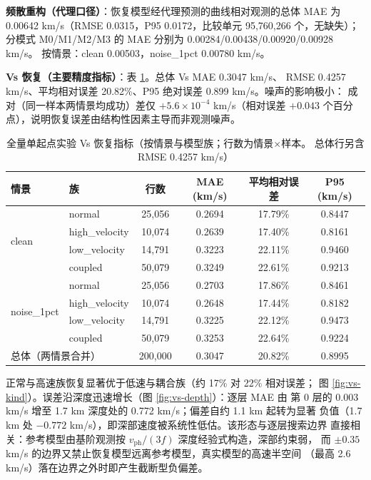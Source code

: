 \documentclass[UTF8,a4paper,11pt]{ctexart}
\begin{document}
\textbf{频散重构（代理口径）}：恢复模型经代理预测的曲线相对观测的总体 MAE 为
0.00642 km/s（RMSE 0.0315，P95 0.0172，比较单元 95{,}760{,}266 个，无缺失）；
分模式 M0/M1/M2/M3 的 MAE 分别为 0.00284/0.00438/0.00920/0.00928 km/s。
按情景：clean 0.00503，noise\_1pct 0.00780 km/s。

\textbf{Vs 恢复（主要精度指标）}：表 \ref{tab:full-vs}。总体 Vs MAE 0.3047 km/s、
RMSE 0.4257 km/s、平均相对误差 20.82\%、P95 绝对误差 0.899 km/s。噪声的影响极小：
成对（同一样本两情景均成功）差仅 \(+5.6\times10^{-4}\) km/s（相对误差 \(+0.043\)
个百分点），说明恢复误差由结构性因素主导而非观测噪声。

\begin{table}[H]
\centering
\caption{全量单起点实验 Vs 恢复指标（按情景与模型族；行数为情景\(\times\)样本。
总体行另含 RMSE 0.4257 km/s）}
\label{tab:full-vs}
\small
\begin{tabular}{llcccc}
\toprule
情景 & 族 & 行数 & MAE (km/s) & 平均相对误差 & P95 (km/s) \\
\midrule
\multirow{4}{*}{clean}
 & normal        & 25{,}056 & 0.2694 & 17.79\% & 0.8447 \\
 & high\_velocity & 10{,}074 & 0.2639 & 17.40\% & 0.8161 \\
 & low\_velocity  & 14{,}791 & 0.3223 & 22.11\% & 0.9460 \\
 & coupled       & 50{,}079 & 0.3249 & 22.61\% & 0.9213 \\
\midrule
\multirow{4}{*}{noise\_1pct}
 & normal        & 25{,}056 & 0.2703 & 17.86\% & 0.8461 \\
 & high\_velocity & 10{,}074 & 0.2648 & 17.44\% & 0.8182 \\
 & low\_velocity  & 14{,}791 & 0.3225 & 22.12\% & 0.9473 \\
 & coupled       & 50{,}079 & 0.3253 & 22.64\% & 0.9224 \\
\midrule
\multicolumn{2}{l}{总体（两情景合并）} & 200{,}000 & 0.3047 & 20.82\% & 0.8995 \\
\bottomrule
\end{tabular}
\end{table}

正常与高速族恢复显著优于低速与耦合族（约 17\% 对 22\% 相对误差；
图 \ref{fig:vs-kind}）。误差沿深度迅速增长（图 \ref{fig:vs-depth}）：逐层 MAE 由
第 0 层的 0.003 km/s 增至 1.7 km 深度处的 0.772 km/s；偏差自约 1.1 km 起转为显著
负值（1.7 km 处 \(-0.772\) km/s），即深部速度被系统性低估。该形态与逐层搜索边界
直接相关：参考模型由基阶观测按 \(v_{\text{ph}}/(3f)\) 深度经验式构造，深部约束弱，
而 \(\pm0.35\) km/s 的边界又禁止恢复模型远离参考模型，真实模型的高速半空间
（最高 2.6 km/s）落在边界之外时即产生截断型负偏差。
\end{document}
